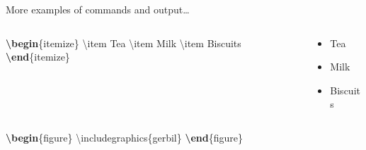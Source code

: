 \documentclass[,aspectratio=43]{beamer}
\newenvironment{Shaded}{\begin{snugshade}}{\end{snugshade}}
\newcommand{\BuiltInTok}[1]{#1}
\newcommand{\ExtensionTok}[1]{#1}
\newcommand{\FunctionTok}[1]{\textcolor[rgb]{0.02,0.16,0.49}{#1}}
\newcommand{\KeywordTok}[1]{\textcolor[rgb]{0.00,0.44,0.13}{\textbf{#1}}}
\newcommand{\NormalTok}[1]{#1}
\begin{document}
\begin{frame}[fragile]{More examples of commands and output\ldots{}}
\protect\hypertarget{more-examples-of-commands-and-output}{}
\begin{columns}[T]
\begin{column}{0.48\textwidth}
\begin{Shaded}
\begin{Highlighting}[]
\KeywordTok{\textbackslash{}begin}\NormalTok{\{}\ExtensionTok{itemize}\NormalTok{\}}
  \FunctionTok{\textbackslash{}item}\NormalTok{ Tea}
  \FunctionTok{\textbackslash{}item}\NormalTok{ Milk}
  \FunctionTok{\textbackslash{}item}\NormalTok{ Biscuits}
\KeywordTok{\textbackslash{}end}\NormalTok{\{}\ExtensionTok{itemize}\NormalTok{\}}
\end{Highlighting}
\end{Shaded}
\end{column}

\begin{column}{0.48\textwidth}
\vspace{2em}

\begin{itemize}
\item Tea
\item Milk
\item Biscuits
\end{itemize}
\end{column}
\end{columns}

\begin{columns}[T]
\begin{column}{0.48\textwidth}
\begin{Shaded}
\begin{Highlighting}[]
\KeywordTok{\textbackslash{}begin}\NormalTok{\{}\ExtensionTok{figure}\NormalTok{\}}
  \BuiltInTok{\textbackslash{}includegraphics}\NormalTok{\{}\ExtensionTok{gerbil}\NormalTok{\}}
\KeywordTok{\textbackslash{}end}\NormalTok{\{}\ExtensionTok{figure}\NormalTok{\}}
\end{Highlighting}
\end{Shaded}
\end{column}


\end{columns}
\end{frame}
\end{document}
